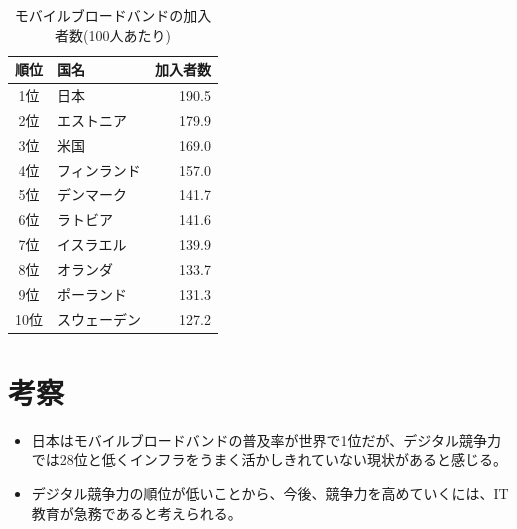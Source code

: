 \documentclass[a4paper,11pt,dvipdfmx]{ujarticle}
\begin{document}
\begin{table}[htbp]
    \centering
    \caption{モバイルブロードバンドの加入者数(100人あたり)}
    \label{tbl:利用状況}

    \begin{tabular}{|c|l|r|}
        \hline
        順位 & 国名 & 加入者数 \\
        \hline
        1位 & 日本 & 190.5\\
        \hline
        2位 & エストニア & 179.9\\
        \hline
        3位 & 米国 & 169.0\\
        \hline
        4位 & フィンランド & 157.0\\
        \hline
        5位 & デンマーク & 141.7\\
        \hline
        6位 & ラトビア & 141.6\\
        \hline 
        7位 & イスラエル & 139.9\\
        \hline
        8位 & オランダ & 133.7\\
        \hline
        9位 & ポーランド & 131.3\\
        \hline
        10位 & スウェーデン & 127.2\\
        \hline
    \end{tabular}
\end{table}

\section{考察}

\begin{itemize}
    \item 日本はモバイルブロードバンドの普及率が世界で1位だが、デジタル競争力では28位と低くインフラをうまく活かしきれていない現状があると感じる。
    \item デジタル競争力の順位が低いことから、今後、競争力を高めていくには、IT教育が急務であると考えられる。
\end{itemize}


\end{document}
